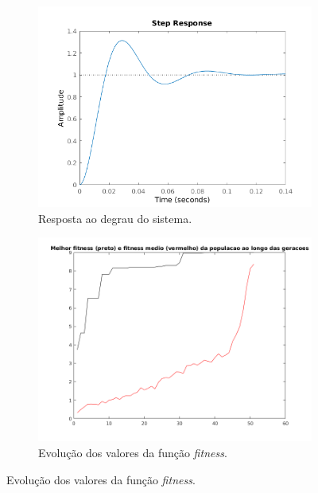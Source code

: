 \begin {enumerate}
	\FloatBarrier
			    
	\begin{figure}[h!]
	
	\centering
	
		\begin{subfigure}{.5\textwidth}
		  \centering
		  \includegraphics[width=1\linewidth]{image/step_pid_ex_d_mod}
		  \caption{Resposta ao degrau do sistema.}
		  \label{fig:pid_step_d_mod}
		\end{subfigure}%
		\begin{subfigure}{.5\textwidth}
		  \centering
		  \includegraphics[width=1\linewidth]{image/melhor_fitness_pid_ex_d_mod}
		  \caption{Evolução dos valores da função \textit{fitness}.}
		  \label{fig:pid_fitness_d_mod}
		\end{subfigure}%
		

\end{figure}
\end{enumerate}
